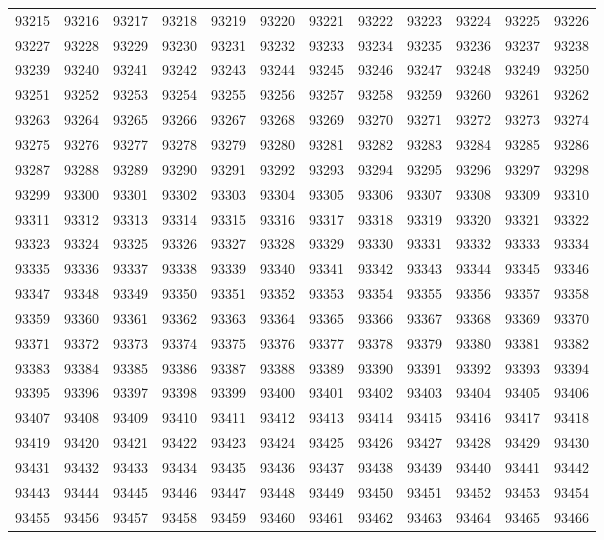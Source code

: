 \begin{center}
\begin{longtable}{llllllllllll}
93215 &93216 &93217 &93218 &93219 &93220 &93221 &93222 &93223 &93224 &93225 &93226 \\
93227 &93228 &93229 &93230 &93231 &93232 &93233 &93234 &93235 &93236 &93237 &93238 \\
93239 &93240 &93241 &93242 &93243 &93244 &93245 &93246 &93247 &93248 &93249 &93250 \\
93251 &93252 &93253 &93254 &93255 &93256 &93257 &93258 &93259 &93260 &93261 &93262 \\
93263 &93264 &93265 &93266 &93267 &93268 &93269 &93270 &93271 &93272 &93273 &93274 \\
93275 &93276 &93277 &93278 &93279 &93280 &93281 &93282 &93283 &93284 &93285 &93286 \\
93287 &93288 &93289 &93290 &93291 &93292 &93293 &93294 &93295 &93296 &93297 &93298 \\
93299 &93300 &93301 &93302 &93303 &93304 &93305 &93306 &93307 &93308 &93309 &93310 \\
93311 &93312 &93313 &93314 &93315 &93316 &93317 &93318 &93319 &93320 &93321 &93322 \\
93323 &93324 &93325 &93326 &93327 &93328 &93329 &93330 &93331 &93332 &93333 &93334 \\
93335 &93336 &93337 &93338 &93339 &93340 &93341 &93342 &93343 &93344 &93345 &93346 \\
93347 &93348 &93349 &93350 &93351 &93352 &93353 &93354 &93355 &93356 &93357 &93358 \\
93359 &93360 &93361 &93362 &93363 &93364 &93365 &93366 &93367 &93368 &93369 &93370 \\
93371 &93372 &93373 &93374 &93375 &93376 &93377 &93378 &93379 &93380 &93381 &93382 \\
93383 &93384 &93385 &93386 &93387 &93388 &93389 &93390 &93391 &93392 &93393 &93394 \\
93395 &93396 &93397 &93398 &93399 &93400 &93401 &93402 &93403 &93404 &93405 &93406 \\
93407 &93408 &93409 &93410 &93411 &93412 &93413 &93414 &93415 &93416 &93417 &93418 \\
93419 &93420 &93421 &93422 &93423 &93424 &93425 &93426 &93427 &93428 &93429 &93430 \\
93431 &93432 &93433 &93434 &93435 &93436 &93437 &93438 &93439 &93440 &93441 &93442 \\
93443 &93444 &93445 &93446 &93447 &93448 &93449 &93450 &93451 &93452 &93453 &93454 \\
93455 &93456 &93457 &93458 &93459 &93460 &93461 &93462 &93463 &93464 &93465 &93466 \\

\end{longtable}
\end{center}
